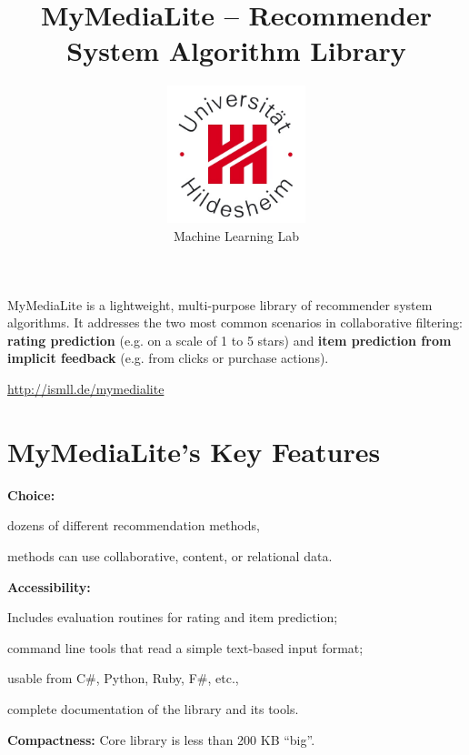 \documentclass[a4paper, foldmark, 12pt]{leaflet}
\title{MyMediaLite -- Recommender System Algorithm Library}
\author{
	\includegraphics[width=4.0cm]{fig/uni-hildesheim-400x400.jpg}\\
	Machine Learning Lab
}
\date{}
\begin{document}
\maketitle

MyMediaLite is a lightweight, multi-purpose library
of recommender system algorithms.
It addresses the two most common scenarios in collaborative filtering:
\textbf{rating prediction} (e.g. on a scale of 1 to 5 stars)
and \textbf{item prediction from implicit feedback} (e.g. from clicks or purchase actions).

\begin{center}
	\url{http://ismll.de/mymedialite}
\end{center}

\newpage

\section{MyMediaLite's Key Features}

\textbf{Choice:} \vspace{-0.6em}
		\begin{list}{}{\leftmargin=1em} \addtolength{\itemsep}{-0.5\baselineskip}
                \item dozens of different recommendation methods,
                \item methods can use collaborative, content, or relational data.
        \end{list}

\vspace{-0.5em}

\textbf{Accessibility:} \vspace{-0.6em}
    	\begin{list}{}{\leftmargin=1em}\addtolength{\itemsep}{-0.5\baselineskip}
                \item Includes evaluation routines for rating and item prediction;
                \item command line tools that read a simple text-based input format;
				\item usable from C\#, Python, Ruby, F\#, etc.,
                \item complete documentation of the library and its tools.
        \end{list}

\vspace{-0.5em}

\textbf{Compactness:} Core library is less than 200 KB ``big''.
\end{document}
